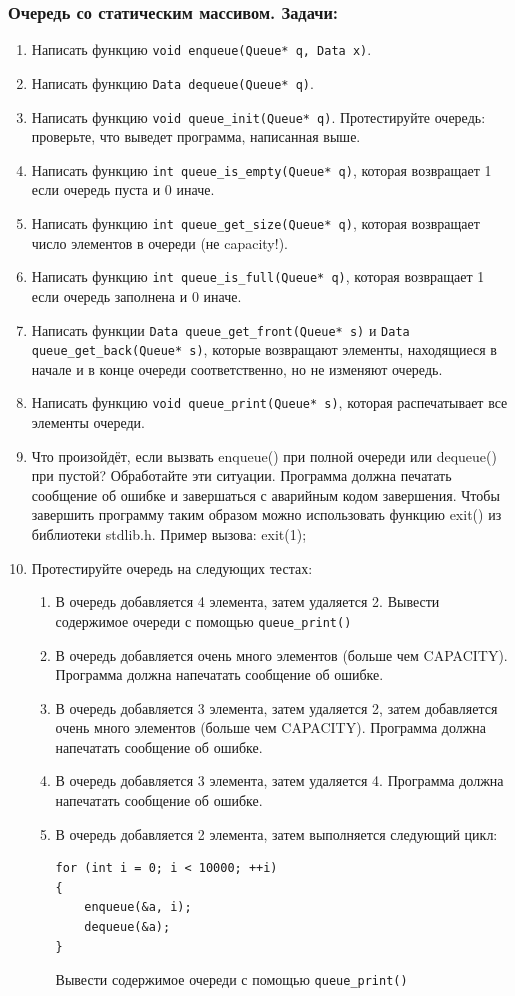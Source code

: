 \documentclass{article}
\begin{document}
\subsubsection*{Очередь со статическим массивом. Задачи:}
\begin{enumerate}
\item Написать функцию \texttt{void enqueue(Queue* q, Data x)}.
\item Написать функцию \texttt{Data dequeue(Queue* q)}.
\item Написать функцию \texttt{void queue\_init(Queue* q)}.
 Протестируйте очередь: проверьте, что выведет программа, написанная выше.
\item Написать функцию \texttt{int queue\_is\_empty(Queue* q)}, которая возвращает 1 если очередь пуста и 0 иначе.
\item Написать функцию \texttt{int queue\_get\_size(Queue* q)}, которая возвращает число элементов в очереди (не capacity!).
\item Написать функцию \texttt{int queue\_is\_full(Queue* q)}, которая возвращает 1 если очередь заполнена и 0 иначе.
\item Написать функции \texttt{Data queue\_get\_front(Queue* s)} и \texttt{Data queue\_get\_back(Queue* s)}, которые возвращают элементы, находящиеся в начале и в конце очереди соответственно, но не изменяют очередь.
\item Написать функцию \texttt{void queue\_print(Queue* s)}, которая распечатывает все элементы очереди.
\item Что произойдёт, если вызвать enqueue() при полной очереди или dequeue() при пустой? Обработайте эти ситуации. Программа должна печатать сообщение об ошибке и завершаться с аварийным кодом завершения. Чтобы завершить программу таким образом можно использовать функцию exit() из библиотеки stdlib.h. Пример вызова: exit(1);

\item Протестируйте очередь на следующих тестах:
\begin{enumerate}
\item В очередь добавляется 4 элемента, затем удаляется 2. Вывести содержимое очереди с помощью \texttt{queue\_print()}
\item В очередь добавляется очень много элементов (больше чем CAPACITY). Программа должна напечатать сообщение об ошибке.
\item В очередь добавляется 3 элемента, затем удаляется 2, затем добавляется очень много элементов (больше чем CAPACITY). Программа должна напечатать сообщение об ошибке.
\item В очередь добавляется 3 элемента, затем удаляется 4. Программа должна напечатать сообщение об ошибке.
\item В очередь добавляется 2 элемента, затем выполняется следующий цикл:
\begin{verbatim}
for (int i = 0; i < 10000; ++i)
{
    enqueue(&a, i);
    dequeue(&a);
}
\end{verbatim}
Вывести содержимое очереди с помощью \texttt{queue\_print()}
\end{enumerate}


\end{enumerate}
\end{document}
